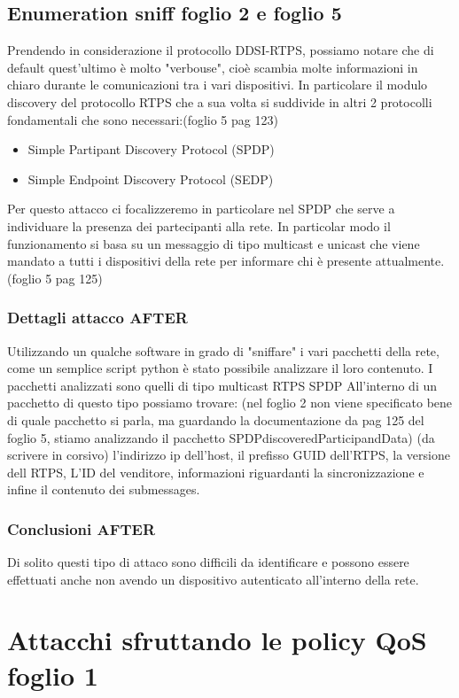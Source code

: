 \subsection{Enumeration sniff foglio 2 e foglio 5}
Prendendo in considerazione il protocollo DDSI-RTPS, possiamo notare che di
default quest'ultimo è molto "verbouse", cioè scambia molte informazioni in
chiaro durante le comunicazioni tra i vari dispositivi. In particolare
il modulo discovery del protocollo RTPS che a sua volta si suddivide in
altri 2 protocolli fondamentali che sono necessari:(foglio 5 pag 123)
\begin{itemize}
    \item Simple Partipant Discovery Protocol (SPDP)
    \item Simple Endpoint Discovery Protocol (SEDP)
\end{itemize}
Per questo attacco ci focalizzeremo in particolare nel SPDP che serve a
individuare la presenza dei partecipanti alla rete. In particolar modo
il funzionamento si basa su un messaggio di tipo multicast e unicast che viene
mandato a tutti i dispositivi della rete per informare chi è presente attualmente.
(foglio 5 pag 125)

\subsubsection{Dettagli attacco AFTER}
Utilizzando un qualche software in grado di "sniffare" i vari pacchetti della
rete, come un semplice script python è stato possibile analizzare il loro
contenuto. I pacchetti analizzati sono quelli di tipo multicast RTPS SPDP
All'interno di un pacchetto di questo tipo possiamo trovare: (nel foglio 2 
non viene specificato bene di quale pacchetto si parla, ma guardando la documentazione
da pag 125 del foglio 5, stiamo analizzando il pacchetto SPDPdiscoveredParticipandData)
(da scrivere in corsivo) l'indirizzo ip dell'host, il prefisso GUID dell'RTPS,
la versione dell RTPS, L'ID del venditore, informazioni riguardanti la sincronizzazione
e infine il contenuto dei submessages.


\subsubsection{Conclusioni AFTER}
Di solito questi tipo di attaco sono difficili da identificare e possono essere
effettuati anche non avendo un dispositivo autenticato all'interno della rete.

\section{Attacchi sfruttando le policy QoS foglio 1}

